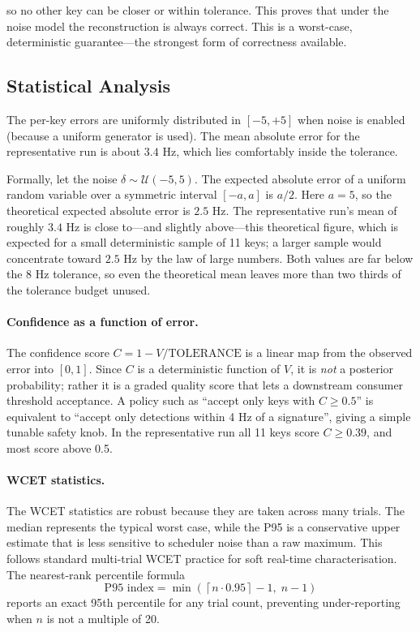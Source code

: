 \documentclass[11pt,a4paper]{article}
\begin{document}
so no other key can be closer or within tolerance. This proves that under the
noise model the reconstruction is always correct. This is a worst-case,
deterministic guarantee---the strongest form of correctness available.

\subsection{Statistical Analysis}

The per-key errors are uniformly distributed in $[-5, +5]$ when noise is
enabled (because a uniform generator is used). The mean absolute error for
the representative run is about $3.4$ Hz, which lies comfortably inside the
tolerance.

Formally, let the noise $\delta \sim \mathcal{U}(-5, 5)$. The expected absolute
error of a uniform random variable over a symmetric interval $[-a, a]$ is
$a/2$. Here $a = 5$, so the theoretical expected absolute error is $2.5$ Hz. The
representative run's mean of roughly $3.4$ Hz is close to---and slightly above---this
theoretical figure, which is expected for a small deterministic sample of 11
keys; a larger sample would concentrate toward $2.5$ Hz by the law of large
numbers. Both values are far below the 8 Hz tolerance, so even the theoretical
mean leaves more than two thirds of the tolerance budget unused.

\paragraph{Confidence as a function of error.}
The confidence score $C = 1 - V/\text{TOLERANCE}$ is a linear map from the
observed error into $[0,1]$. Since $C$ is a deterministic function of $V$,
it is \emph{not} a posterior probability; rather it is a graded quality score
that lets a downstream consumer threshold acceptance. A policy such as ``accept
only keys with $C \ge 0.5$'' is equivalent to ``accept only detections within
4 Hz of a signature'', giving a simple tunable safety knob. In the
representative run all 11 keys score $C \ge 0.39$, and most score above 0.5.

\paragraph{WCET statistics.}
The WCET statistics are robust because they are taken across many trials. The
median represents the typical worst case, while the P95 is a conservative upper
estimate that is less sensitive to scheduler noise than a raw maximum. This
follows standard multi-trial WCET practice for soft real-time characterisation.
The nearest-rank percentile formula
\[
\text{P95 index} = \min\left(\left\lceil n \cdot 0.95 \right\rceil - 1,\; n - 1\right)
\]
reports an exact 95th percentile for any trial count, preventing
under-reporting when $n$ is not a multiple of 20.
\end{document}
